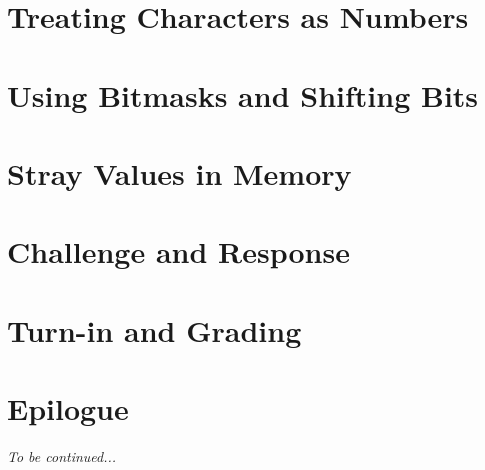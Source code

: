 \section{Treating Characters as Numbers}\label{sec:char-num}    

\section{Using Bitmasks and Shifting Bits}\label{sec:bit-ops}   

\section{Stray Values in Memory}

    \HasKeyboard

    \ArchieWroteSmellyCode

    

\section{Challenge and Response}                                

\section{Turn-in and Grading}                                   

\section*{Epilogue}                                             \InsurancePreview

\textit{To be continued...}


